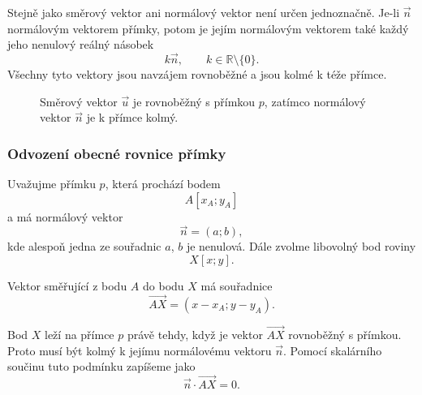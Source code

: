 Stejně jako směrový vektor ani normálový vektor není určen jednoznačně.
Je-li $\vec{n}$ normálovým vektorem přímky, potom je jejím normálovým
vektorem také každý jeho nenulový reálný násobek
\[
    k\vec{n},
    \qquad
    k\in\mathbb{R}\setminus\{0\}.
\]
Všechny tyto vektory jsou navzájem rovnoběžné a jsou kolmé k téže
přímce.

\begin{figure}[H]
    \centering
    \caption{Směrový vektor $\vec{u}$ je rovnoběžný s přímkou $p$,
    zatímco normálový vektor $\vec{n}$ je k přímce kolmý.}
    \label{fig:Normal_vector_line}
\end{figure}

\subsubsection{Odvození obecné rovnice přímky}
\label{subsubsec:Derivation_general_line_equation}

Uvažujme přímku $p$, která prochází bodem
\[
    A[x_A;y_A]
\]
a má normálový vektor
\[
    \vec{n}=(a;b),
\]
kde alespoň jedna ze souřadnic $a$, $b$ je nenulová. Dále zvolme
libovolný bod roviny
\[
    X[x;y].
\]

Vektor směřující z bodu $A$ do bodu $X$ má souřadnice
\[
    \overrightarrow{AX}=(x-x_A;y-y_A).
\]

Bod $X$ leží na přímce $p$ právě tehdy, když je vektor
$\overrightarrow{AX}$ rovnoběžný s přímkou. Proto musí být kolmý
k jejímu normálovému vektoru $\vec{n}$. Pomocí skalárního součinu tuto
podmínku zapíšeme jako
\begin{equation}\label{eq:Point_normal_condition_line}
    \vec{n}\cdot\overrightarrow{AX}=0.
\end{equation}

